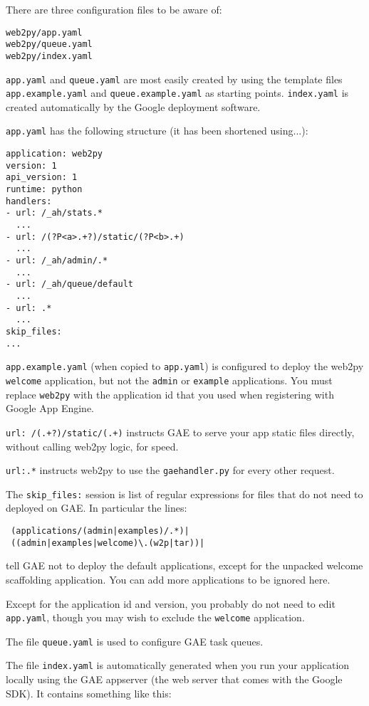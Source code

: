 \documentclass[justified,sixbynine,notoc]{tufte-book}
\def\ft{\small\tt}
\begin{document}
\begin{fullwidth}
There are three configuration files to be aware of:
\begin{lstlisting}
web2py/app.yaml
web2py/queue.yaml
web2py/index.yaml
\end{lstlisting}

{\ft app.yaml} and {\ft queue.yaml} are most easily created by using the template files {\ft app.example.yaml} and {\ft queue.example.yaml} as starting points. {\ft index.yaml} is created automatically by the Google deployment software.

{\ft app.yaml} has the following structure (it has been shortened using...):

\begin{lstlisting}
application: web2py
version: 1
api_version: 1
runtime: python
handlers:
- url: /_ah/stats.*
  ...
- url: /(?P<a>.+?)/static/(?P<b>.+)
  ...
- url: /_ah/admin/.*
  ...
- url: /_ah/queue/default
  ...
- url: .*
  ...
skip_files:
...
\end{lstlisting}

{\ft app.example.yaml} (when copied to {\ft app.yaml}) is configured to deploy the web2py {\ft welcome} application, but not the {\ft admin} or {\ft example} applications. You must replace {\ft web2py} with the application id that you used when registering with Google App Engine.

{\ft url: /(.+?)/static/(.+)} instructs GAE to serve your app static files directly, without calling web2py logic, for speed.

{\ft url:.*} instructs web2py to use the {\ft gaehandler.py} for every other request.

The {\ft skip\_files:} session is list of regular expressions for files that do not need to deployed on GAE. In particular the lines:

\begin{lstlisting}
 (applications/(admin|examples)/.*)|
 ((admin|examples|welcome)\.(w2p|tar))|
\end{lstlisting}
\noindent tell GAE not to deploy the default applications, except for the unpacked welcome scaffolding application. You can add more applications to be ignored here.

Except for the application id and version, you probably do not need to edit {\ft app.yaml}, though you may wish to exclude the {\ft welcome} application.

The file {\ft queue.yaml} is used to configure GAE task queues.

The file {\ft index.yaml} is automatically generated when you run your application locally using the GAE appserver (the web server that comes with the Google SDK). It contains something like this:


\end{fullwidth}
\end{document}
